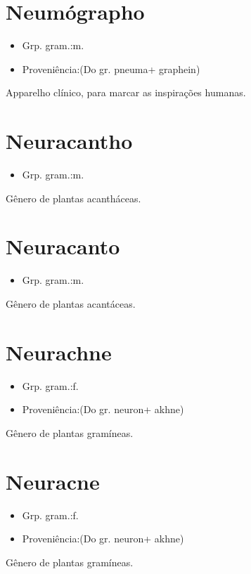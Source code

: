 \section{Neumógrapho}
\begin{itemize}
\item {Grp. gram.:m.}
\end{itemize}
\begin{itemize}
\item {Proveniência:(Do gr. \textunderscore pneuma\textunderscore  + \textunderscore graphein\textunderscore )}
\end{itemize}
Apparelho clínico, para marcar as inspirações humanas.
\section{Neuracantho}
\begin{itemize}
\item {Grp. gram.:m.}
\end{itemize}
Gênero de plantas acantháceas.
\section{Neuracanto}
\begin{itemize}
\item {Grp. gram.:m.}
\end{itemize}
Gênero de plantas acantáceas.
\section{Neurachne}
\begin{itemize}
\item {Grp. gram.:f.}
\end{itemize}
\begin{itemize}
\item {Proveniência:(Do gr. \textunderscore neuron\textunderscore  + \textunderscore akhne\textunderscore )}
\end{itemize}
Gênero de plantas gramíneas.
\section{Neuracne}
\begin{itemize}
\item {Grp. gram.:f.}
\end{itemize}
\begin{itemize}
\item {Proveniência:(Do gr. \textunderscore neuron\textunderscore  + \textunderscore akhne\textunderscore )}
\end{itemize}
Gênero de plantas gramíneas.
